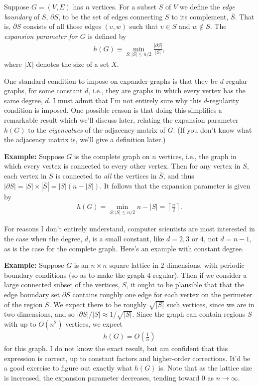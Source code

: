 \documentclass[12pt]{article}
\begin{document}
Suppose $G = (V,E)$ has $n$ vertices.  For a subset $S$ of $V$ we
define the \emph{edge boundary} of $S$, $\partial S$, to be the set of
edges connecting $S$ to its complement, $\overline S$.  That is,
$\partial S$ consists of all those edges $(v,w)$ such that $v \in S$
and $w \not \in S$.  The \emph{expansion parameter for $G$} is defined
by
\begin{eqnarray}
  h(G) \equiv \min_{S: |S| \leq n/2} \frac{|\partial S|}{|S|},
\end{eqnarray}
where $|X |$ denotes the size of a set $X$.

One standard condition to impose on expander graphs is that they be
$d$-regular graphs, for some constant $d$, i.e., they are graphs in
which every vertex has the same degree, $d$.  I must admit that I'm
not entirely sure why this $d$-regularity condition is imposed. One
possible reason is that doing this simplifies a remarkable result
which we'll discuss later, relating the expansion parameter $h(G)$ to
the \emph{eigenvalues} of the adjacency matrix of $G$.  (If you don't
know what the adjacency matrix is, we'll give a definition later.)

\textbf{Example:} Suppose $G$ is the complete graph on $n$ vertices,
i.e., the graph in which every vertex is connected to every other
vertex.  Then for any vertex in $S$, each vertex in $S$ is connected
to \emph{all} the vertices in $\overline S$, and thus $|\partial S| =
|S| \times |\overline S| = |S|(n-|S|)$.  It follows that the expansion
parameter is given by
\begin{eqnarray}
  h(G) = \min_{S: |S|\leq n/2} n-|S| = \left\lceil \frac{n}{2} \right\rceil.
\end{eqnarray}

For reasons I don't entirely understand, computer scientists are most
interested in the case when the degree, $d$, is a small constant, like
$d = 2,3$ or $4$, not $d=n-1$, as is the case for the complete graph.
Here's an example with constant degree.

\textbf{Example:} Suppose $G$ is an $n \times n$ square lattice in $2$
dimensions, with periodic boundary conditions (so as to make the graph
$4$-regular).  Then if we consider a large connected subset of the
vertices, $S$, it ought to be plausible that that the edge boundary
set $\partial S$ contains roughly one edge for each vertex on the
perimeter of the region $S$.  We expect there to be roughly
$\sqrt{|S|}$ such vertices, since we are in two dimensions, and so
$|\partial S|/|S| \approx 1/\sqrt{|S|}$.  Since the graph can contain
regions $S$ with up to $O(n^2)$ vertices, we expect
\begin{eqnarray}
  h(G) = O\left( \frac{1}{n} \right)
\end{eqnarray}
for this graph.  I do not know the exact result, but am confident that
this expression is correct, up to constant factors and higher-order
corrections.  It'd be a good exercise to figure out exactly what
$h(G)$ is.  Note that as the lattice size is increased, the expansion
parameter decreases, tending toward $0$ as $n\rightarrow \infty$.
\end{document}

